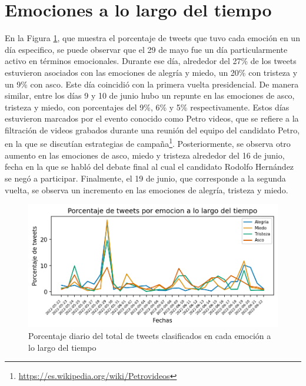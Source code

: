\section{Emociones a lo largo del tiempo}



En la Figura \ref{figure:tweets_percent_tiempo}, que muestra el porcentaje de tweets que tuvo cada emoción en un día especifico, se puede observar que el 29 de mayo fue un día particularmente activo en términos emocionales. Durante ese día, alrededor del 27\% de los tweets estuvieron asociados con las emociones de alegría y miedo, un 20\% con tristeza y un 9\% con asco. Este día coincidió con la primera vuelta presidencial. De manera similar, entre los días 9 y 10 de junio hubo un repunte en las emociones de asco, tristeza y miedo, con porcentajes del 9\%, 6\% y 5\% respectivamente. Estos días estuvieron marcados por el evento conocido como Petro videos, que se refiere a la filtración de videos grabados durante una reunión del equipo del candidato Petro, en la que se discutían estrategias de campaña\footnote{\url{https://es.wikipedia.org/wiki/Petrovideos}}. Posteriormente, se observa otro aumento en las emociones de asco, miedo y tristeza alrededor del 16 de junio, fecha en la que se habló del debate final al cual el candidato Rodolfo Hernández se negó a participar. Finalmente, el 19 de junio, que corresponde a la segunda vuelta, se observa un incremento en las emociones de alegría, tristeza y miedo.

\begin{figure}[!htbp]
	\centering
	\includegraphics{Images & Logos/Results/Porcentaje de tweets por emocion a lo largo del tiempo.png}
	\caption{Porcentaje diario del total de tweets clasificados en cada emoción a lo largo del tiempo}
	\label{figure:tweets_percent_tiempo}
\end{figure}

